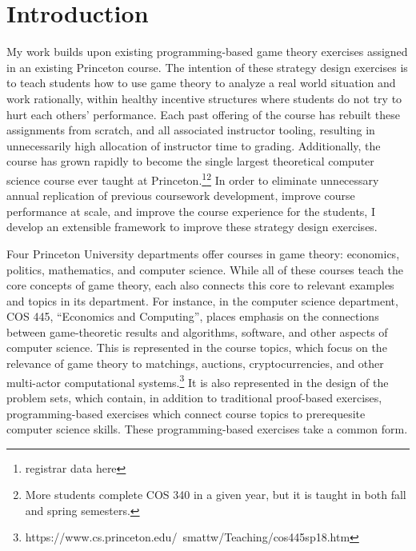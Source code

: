 \documentclass[pageno]{jpaper}
\begin{document}
\section*{Introduction}
My work builds upon existing programming-based game theory exercises assigned in an existing Princeton course.
The intention of these strategy design exercises is to teach students how to use game theory to analyze a real world situation and work rationally, within healthy incentive structures where students do not try to hurt each others’ performance.
Each past offering of the course has rebuilt these assignments from scratch, and all associated instructor tooling, resulting in unnecessarily high allocation of instructor time to grading.
Additionally, the course has grown rapidly to become the single largest theoretical computer science course ever taught at Princeton.\footnote{registrar data here}\footnote{More students complete COS 340 in a given year, but it is taught in both fall and spring semesters.}
In order to eliminate unnecessary annual replication of previous coursework development, improve course performance at scale, and improve the course experience for the students, I develop an extensible framework to improve these strategy design exercises.

Four Princeton University departments offer courses in game theory: economics, politics, mathematics, and computer science.
While all of these courses teach the core concepts of game theory, each also connects this core to relevant examples and topics in its department.
For instance, in the computer science department, COS 445, ``Economics and Computing'', places emphasis on the connections between game-theoretic results and algorithms, software, and other aspects of computer science.
This is represented in the course topics, which focus on the relevance of game theory to matchings, auctions, cryptocurrencies, and other multi-actor computational systems.\footnote{https://www.cs.princeton.edu/~smattw/Teaching/cos445sp18.htm}
It is also represented in the design of the problem sets, which contain, in addition to traditional proof-based exercises, programming-based exercises which connect course topics to prerequesite computer science skills.
These programming-based exercises take a common form.
\end{document}
